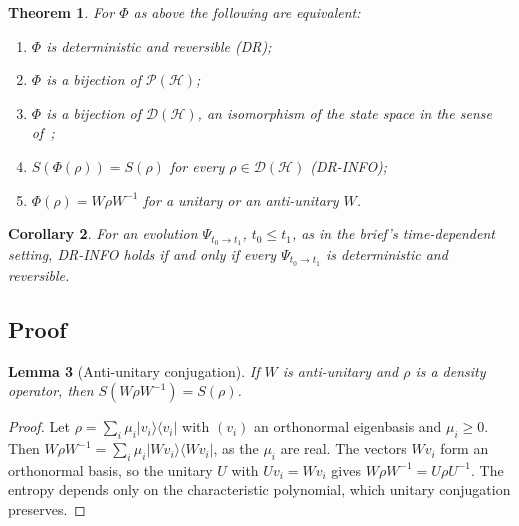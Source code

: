 \documentclass[11pt]{article}
\newtheorem{theorem}{Theorem}[section]
\newtheorem{lemma}[theorem]{Lemma}
\newtheorem{corollary}[theorem]{Corollary}
\theoremstyle{definition}
\theoremstyle{remark}
\begin{document}
\begin{theorem}\label{thm:detrev}
  For $\Phi$ as above the following are equivalent:
  \begin{enumerate}
    \item[(i)] $\Phi$ is deterministic and reversible (DR);
    \item[(ii)] $\Phi$ is a bijection of $\mathcal P(\mathcal H)$;
    \item[(iii)] $\Phi$ is a bijection of $\mathcal D(\mathcal H)$, an isomorphism of the
      state space in the sense of~\cite[Preface, Sec.~\emph{Project overview}]{book};
    \item[(iv)] $S(\Phi(\rho)) = S(\rho)$ for every $\rho\in\mathcal D(\mathcal H)$ (DR-INFO);
    \item[(v)] $\Phi(\rho) = W\rho W^{-1}$ for a unitary or an anti-unitary $W$.
  \end{enumerate}
\end{theorem}

\begin{corollary}\label{cor:detrev}
  For an evolution $\Psi_{t_0\to t_1}$, $t_0\le t_1$, as in the brief's time-dependent setting,
  DR-INFO holds if and only if every $\Psi_{t_0\to t_1}$ is deterministic and reversible.
\end{corollary}

\subsection{Proof}

\begin{lemma}[Anti-unitary conjugation]\label{lem:antiunitary}
  If $W$ is anti-unitary and $\rho$ is a density operator, then $S(W\rho W^{-1}) = S(\rho)$.
\end{lemma}

\begin{proof}
  Let $\rho = \sum_i \mu_i |v_i\rangle\langle v_i|$ with $(v_i)$ an orthonormal eigenbasis and
  $\mu_i\ge0$. Then $W\rho W^{-1} = \sum_i \mu_i |Wv_i\rangle\langle Wv_i|$, as the $\mu_i$ are
  real. The vectors $Wv_i$ form an orthonormal basis, so the unitary $U$ with $Uv_i = Wv_i$ gives
  $W\rho W^{-1} = U\rho U^{-1}$. The entropy depends only on the characteristic polynomial, which
  unitary conjugation preserves.
\end{proof}
\end{document}

